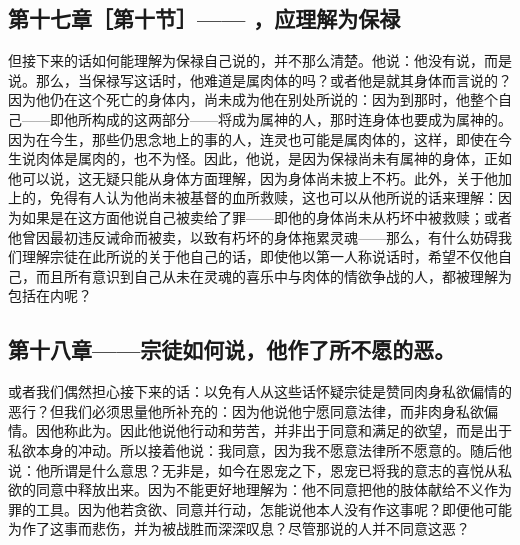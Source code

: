 
\subsection{第十七章［第十节］—— ，应理解为保禄}

但接下来的话如何能理解为保禄自己说的，并不那么清楚。他说：他没有说，而是说。那么，当保禄写这话时，他难道是属肉体的吗？或者他是就其身体而言说的？因为他仍在这个死亡的身体内，尚未成为他在别处所说的：因为到那时，他整个自己——即他所构成的这两部分——将成为属神的人，那时连身体也要成为属神的。因为在今生，那些仍思念地上的事的人，连灵也可能是属肉体的，这样，即使在今生说肉体是属肉的，也不为怪。因此，他说，是因为保禄尚未有属神的身体，正如他可以说，这无疑只能从身体方面理解，因为身体尚未披上不朽。此外，关于他加上的，免得有人认为他尚未被基督的血所救赎，这也可以从他所说的话来理解：因为如果是在这方面他说自己被卖给了罪——即他的身体尚未从朽坏中被救赎；或者他曾因最初违反诫命而被卖，以致有朽坏的身体拖累灵魂——那么，有什么妨碍我们理解宗徒在此所说的关于他自己的话，即使他以第一人称说话时，希望不仅他自己，而且所有意识到自己从未在灵魂的喜乐中与肉体的情欲争战的人，都被理解为包括在内呢？\par


\subsection{第十八章——宗徒如何说，他作了所不愿的恶。}

或者我们偶然担心接下来的话：以免有人从这些话怀疑宗徒是赞同肉身私欲偏情的恶行？但我们必须思量他所补充的：因为他说他宁愿同意法律，而非肉身私欲偏情。因他称此为。因此他说他行动和劳苦，并非出于同意和满足的欲望，而是出于私欲本身的冲动。所以接着他说：我同意，因为我不愿意法律所不愿意的。随后他说：他所谓是什么意思？无非是，如今在恩宠之下，恩宠已将我的意志的喜悦从私欲的同意中释放出来。因为不能更好地理解为：他不同意把他的肢体献给不义作为罪的工具。因为他若贪欲、同意并行动，怎能说他本人没有作这事呢？即便他可能为作了这事而悲伤，并为被战胜而深深叹息？尽管那说的人并不同意这恶？\par

